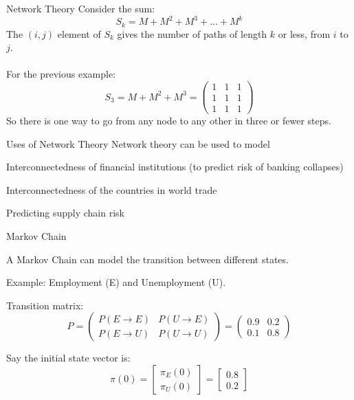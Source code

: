 \documentclass{./../../Latex/teaching_slides}
\begin{document}
\begin{frame}{Network Theory}
\vspace{-0.25cm}
Consider the sum:
$$ S_k = M + M^2 + M^3 +...+M^k $$
The $(i, j)$ element of $S_k$ gives the number of paths of length $k$ or
less, from $i$ to $j$. \\~\\

For the previous example:
$$S_3 = M + M^2 + M^3 = \left(\begin{array}{lll}
1 & 1 & 1 \\
1 & 1 & 1 \\
1 & 1 & 1
\end{array}\right)$$
So there is one way to go from any node to any other in three or fewer steps.
\end{frame}

\begin{frame}{Uses of Network Theory}
Network theory can be used to model \\
\begin{witemize}
  \item Interconnectedness of financial institutions (to predict risk of banking collapses)
  \item Interconnectedness of the countries in world trade
  \item Predicting supply chain risk
\end{witemize}
\end{frame}

\begin{frame}{Markov Chain}
\begin{witemize}
    \item A Markov Chain can model the transition between different states.
    \item Example: Employment (E) and Unemployment (U).
 \item Transition matrix:
\[
P = \begin{pmatrix}
P(E \rightarrow E) & P(U \rightarrow E) \\
P(E \rightarrow U) & P(U \rightarrow U)
\end{pmatrix}
= \begin{pmatrix}
0.9 & 0.2 \\
0.1 & 0.8
\end{pmatrix}
\]
\item Say the initial state vector is:
$$ \pi(0) =  \begin{bmatrix}
\pi_E(0)  \\
\pi_U(0)
\end{bmatrix} =  \begin{bmatrix}
0.8  \\
0.2
\end{bmatrix}
 $$
 \end{witemize}
\end{frame}
\end{document}
